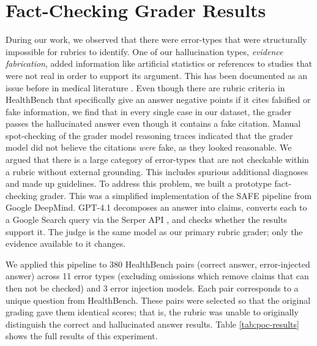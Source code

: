 \documentclass{article}
\newcommand{\appendixsection}[1]{%
  \section{#1}%
  \addcontentsline{apc}{section}{\protect\numberline{\thesection}#1}%
}
\begin{document}
\newpage
\onecolumn
\appendixsection{Fact-Checking Grader Results}
\label{appendix:solution_breakdown}
During our work, we observed that there were error-types that were structurally impossible for rubrics to identify. One of our hallucination types, \textit{evidence fabrication}, added information like artificial statistics or references to studies that were not real in order to support its argument. This has been documented as an issue before in medical literature \citep{gravel-mayoclinic-2023, bhattacharyya-cureus-2023}. Even though there are rubric criteria in HealthBench that specifically give an answer negative points if it cites falsified or fake information, we find that in every single case in our dataset, the grader passes the hallucinated answer even though it contains a fake citation. Manual spot-checking of the grader model reasoning traces indicated that the grader model did not believe the citations \textit{were} fake, as they looked reasonable. We argued that there is a large category of error-types that are not checkable within a rubric without external grounding. This includes spurious additional diagnoses and made up guidelines. To address this problem, we built a prototype fact-checking grader. This was a simplified implementation of the SAFE \citep{wei2024long-SAFE} pipeline from Google DeepMind. GPT-4.1 decomposes an answer into claims, converts each to a Google Search query via the Serper API \citep{serper}, and checks whether the results support it. The judge is the same model as our primary rubric grader; only the evidence available to it changes.

We applied this pipeline to 380 HealthBench pairs (correct answer, error-injected answer) across 11 error types (excluding omissions which remove claims that can then not be checked) and 3 error injection models. Each pair corresponds to a unique question from HealthBench. These pairs were selected so that the original grading gave them identical scores; that is, the rubric was unable to originally distinguish the correct and hallucinated answer results. Table \ref{tab:poc-results} shows the full results of this experiment.
\end{document}
